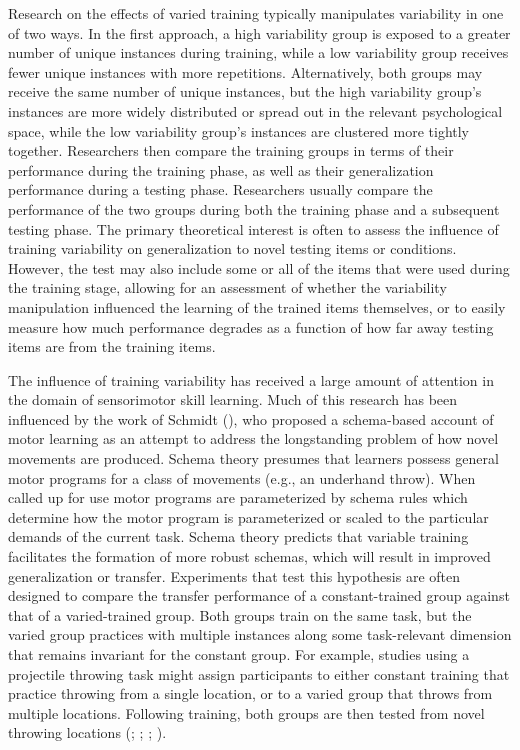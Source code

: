 \documentclass[
  11pt,
  letterpaper,
]{article}
\begin{document}
Research on the effects of varied training typically manipulates
variability in one of two ways. In the first approach, a high
variability group is exposed to a greater number of unique instances
during training, while a low variability group receives fewer unique
instances with more repetitions. Alternatively, both groups may receive
the same number of unique instances, but the high variability group's
instances are more widely distributed or spread out in the relevant
psychological space, while the low variability group's instances are
clustered more tightly together. Researchers then compare the training
groups in terms of their performance during the training phase, as well
as their generalization performance during a testing phase. Researchers
usually compare the performance of the two groups during both the
training phase and a subsequent testing phase. The primary theoretical
interest is often to assess the influence of training variability on
generalization to novel testing items or conditions. However, the test
may also include some or all of the items that were used during the
training stage, allowing for an assessment of whether the variability
manipulation influenced the learning of the trained items themselves, or
to easily measure how much performance degrades as a function of how far
away testing items are from the training items.

The influence of training variability has received a large amount of
attention in the domain of sensorimotor skill learning. Much of this
research has been influenced by the work of Schmidt
(), who proposed a
schema-based account of motor learning as an attempt to address the
longstanding problem of how novel movements are produced. Schema theory
presumes that learners possess general motor programs for a class of
movements (e.g., an underhand throw). When called up for use motor
programs are parameterized by schema rules which determine how the motor
program is parameterized or scaled to the particular demands of the
current task. Schema theory predicts that variable training facilitates
the formation of more robust schemas, which will result in improved
generalization or transfer. Experiments that test this hypothesis are
often designed to compare the transfer performance of a constant-trained
group against that of a varied-trained group. Both groups train on the
same task, but the varied group practices with multiple instances along
some task-relevant dimension that remains invariant for the constant
group. For example, studies using a projectile throwing task might
assign participants to either constant training that practice throwing
from a single location, or to a varied group that throws from multiple
locations. Following training, both groups are then tested from novel
throwing locations
(; ; ; ).
\end{document}
